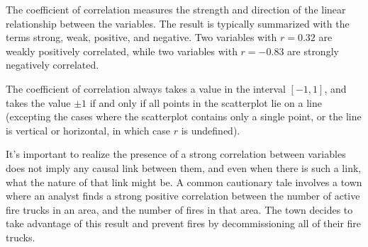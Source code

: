 \begin{center}
\begin{minipage}{0.33\textwidth}
\begin{center}
\end{center}
\end{minipage}
\end{center}



The coefficient of correlation measures the strength and direction of the linear relationship between the variables. The result is typically summarized with the terms strong, weak, positive, and negative. Two variables with $r = 0.32$ are weakly positively correlated, while two variables with $r=-0.83$ are strongly negatively correlated.

\begin{proposition}
The coefficient of correlation always takes a value in the interval $[-1,1]$, and takes the value $\pm 1$ if and only if all points in the scatterplot lie on a line (excepting the cases where the scatterplot contains only a single point, or the line is vertical or horizontal, in which case $r$ is undefined).
\end{proposition}

\begin{remark}
It's important to realize the presence of a strong correlation between variables does not imply any causal link between them, and even when there is such a link, what the nature of that link might be. A common cautionary tale involves a town where an analyst finds a strong positive correlation between the number of active fire trucks in an area, and the number of fires in that area. The town decides to take advantage of this result and prevent fires by decommissioning all of their fire trucks.
\end{remark}


